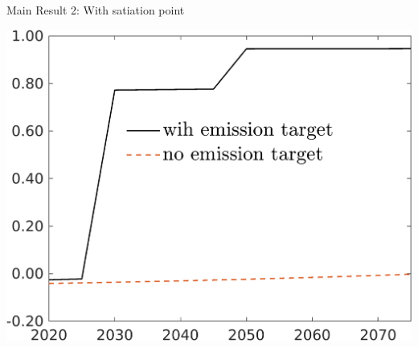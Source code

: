\documentclass[11pt,aspectratio=169]{beamer}
\begin{document}
\begin{frame}{Main Result 2:  With satiation point}
\begin{minipage}[]{0.32\textwidth}
	\includegraphics[width=1\textwidth]{../codding_model/own_basedOnFried/optimalPol_elastS_DisuSci/figures/all_1705/tauf_TargetCompOPT_T_NoTaus_spillover0_sep1_BN1_ineq0_red0_etaa0.79_lgd1.png}
\end{minipage}
\end{frame}
\end{document}
